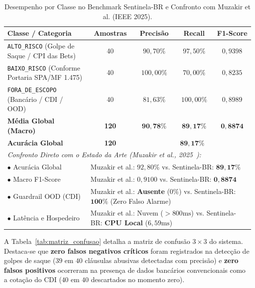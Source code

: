 \begin{table}[!htbp]
\centering
\caption{Desempenho por Classe no Benchmark Sentinela-BR e Confronto com Muzakir et al. (IEEE 2025).}
\label{tab:benchmark_sentinela}
\setlength{\tabcolsep}{4pt}
\scriptsize
\begin{tabular}{lcccc}
\toprule
\textbf{Classe / Categoria} & \textbf{Amostras} & \textbf{Precis\~{a}o} & \textbf{Recall} & \textbf{F1-Score} \\
\midrule
\texttt{ALTO\_RISCO} (Golpe de Saque / CPI das Bets) & 40 & $90{,}70\%$ & $97{,}50\%$ & $0{,}9398$ \\
\texttt{BAIXO\_RISCO} (Conforme Portaria SPA/MF 1.475) & 40 & $100{,}00\%$ & $70{,}00\%$ & $0{,}8235$ \\
\texttt{FORA\_DE\_ESCOPO} (Banc\'{a}rio / CDI / OOD) & 40 & $81{,}63\%$ & $100{,}00\%$ & $0{,}8989$ \\
\midrule
\textbf{M\'{e}dia Global (Macro)} & \textbf{120} & $\mathbf{90{,}78\%}$ & $\mathbf{89{,}17\%}$ & $\mathbf{0{,}8874}$ \\
\textbf{Acur\'{a}cia Global} & \textbf{120} & \multicolumn{3}{c}{$\mathbf{89{,}17\%}$} \\
\midrule
\multicolumn{5}{l}{\textit{Confronto Direto com o Estado da Arte (Muzakir et al., 2025~\cite{muzakir2025text}):}} \\
$\bullet$ Acur\'{a}cia Global & \multicolumn{4}{l}{Muzakir et al.: $92{,}80\%$ \quad vs. \quad Sentinela-BR: $\mathbf{89{,}17\%}$} \\
$\bullet$ Macro F1-Score & \multicolumn{4}{l}{Muzakir et al.: $0{,}9100$ \quad vs. \quad Sentinela-BR: $\mathbf{0{,}8874}$} \\
$\bullet$ Guardrail OOD (CDI) & \multicolumn{4}{l}{Muzakir et al.: \textbf{Ausente} ($0\%$) \quad vs. \quad Sentinela-BR: $\mathbf{100\%}$ (Zero Falso Alarme)} \\
$\bullet$ Lat\^{e}ncia e Hospedeiro & \multicolumn{4}{l}{Muzakir et al.: Nuvem ($> 800\text{ms}$) \quad vs. \quad Sentinela-BR: \textbf{CPU Local} ($6{,}59\text{ms}$)} \\
\bottomrule
\end{tabular}
\end{table}

A Tabela~\ref{tab:matriz_confusao} detalha a matriz de confus\~{a}o $3 \times 3$ do sistema. Destaca-se que \textbf{zero falsos negativos cr\'{i}ticos} foram registrados na detec\c{c}\~{a}o de golpes de saque ($39$ em $40$ cl\'{a}usulas abusivas detectadas com precis\~{a}o) e \textbf{zero falsos positivos} ocorreram na presen\c{c}a de dados banc\'{a}rios convencionais como a cota\c{c}\~{a}o do CDI ($40$ em $40$ descartados no momento zero).

